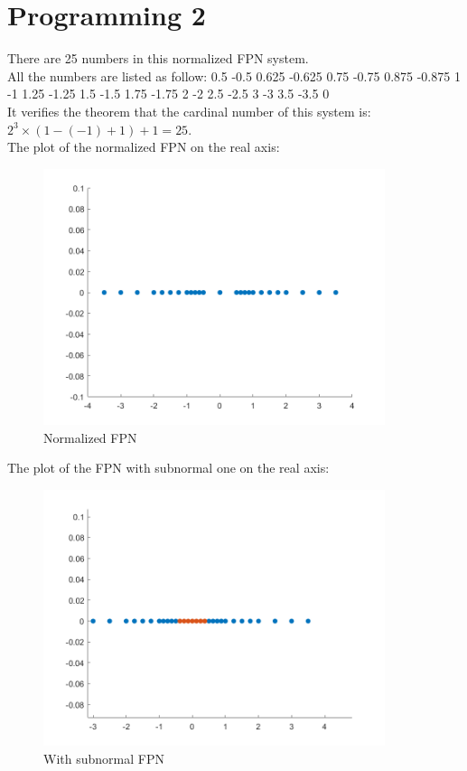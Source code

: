 \documentclass[UTF8]{ctexart}
\begin{document}
\section*{Programming 2}

There are 25 numbers in this normalized FPN system.\\
All the numbers are listed as follow: 
0.5 -0.5 0.625 -0.625 0.75 -0.75 0.875 -0.875 1 -1 1.25 -1.25 1.5 -1.5 1.75 -1.75 2 -2 2.5 -2.5 3 -3 3.5 -3.5 0 \\
It verifies the theorem that the cardinal number of this system is:$2^3 \times (1-(-1)+1)+1 = 25$.\\
The plot of the normalized FPN on the real axis:\\
 \begin{figure}[htp]
    \centering
    \includegraphics[width=10cm]{Bplot1.png}
    \caption{Normalized FPN}
    \label{fig:1L}
\end{figure}

The plot of the FPN with subnormal one on the real axis:\\
 \begin{figure}[htp]
    \centering
    \includegraphics[width=10cm]{Bplot.png}
    \caption{With subnormal FPN}
    \label{fig:1L}
\end{figure}
\end{document}
